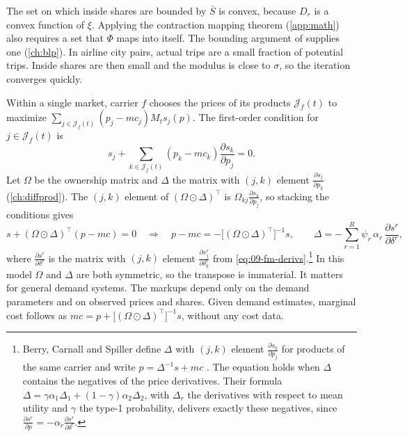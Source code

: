 The set on which inside shares are bounded by $\bar S$ is convex, because $D_r$ is a convex function of
$\xi$. Applying the contraction mapping theorem (\cref{app:math}) also requires a set that $\Phi$ maps
into itself. The bounding argument of \citet{BerryLevinsohnPakes1995} supplies one (\cref{ch:blp}).
In airline city pairs, actual trips are a small fraction of potential trips. Inside shares are then
small and the modulus is close to $\sigma$, so the iteration converges quickly.

Within a single market, carrier $f$ chooses the prices of its products $\mathcal{J}_f(t)$ to maximize
$\sum_{j\in\mathcal{J}_f(t)}(p_j-mc_j)M_ts_j(p)$. The first-order condition for $j\in\mathcal{J}_f(t)$ is
\begin{equation*}
s_j+\sum_{k\in\mathcal{J}_f(t)}(p_k-mc_k)\frac{\partial s_k}{\partial p_j}=0 .
\end{equation*}
Let $\Omega$ be the ownership matrix and $\Delta$ the matrix with $(j,k)$ element
$\frac{\partial s_j}{\partial p_k}$ (\cref{ch:diffprod}). The $(j,k)$ element of
$(\Omega\odot\Delta)^\top$ is $\Omega_{kj}\frac{\partial s_k}{\partial p_j}$, so stacking the conditions
gives
\begin{equation}\label{eq:09-fm-markup}
s+(\Omega\odot\Delta)^\top(p-mc)=0
\quad\Longrightarrow\quad
p-mc=-\big[(\Omega\odot\Delta)^\top\big]^{-1}s,
\qquad
\Delta=-\sum_{r=1}^R\psi_r\,\alpha_r\,\frac{\partial s^r}{\partial\delta^r},
\end{equation}
where $\frac{\partial s^r}{\partial\delta^r}$ is the matrix with $(j,k)$ element
$\frac{\partial s^r_j}{\partial\delta^r_k}$ from \eqref{eq:09-fm-derivs}.\footnote{Berry, Carnall and
Spiller define $\Delta$ with $(j,k)$ element $\frac{\partial s_k}{\partial p_j}$ for products of the same
carrier and write $p=\Delta^{-1}s+mc$ \citep[pp.~15--16]{BerryCarnallSpiller2006}. The equation holds when
$\Delta$ contains the negatives of the price derivatives. Their formula
$\Delta=\gamma\alpha_1\Delta_1+(1-\gamma)\alpha_2\Delta_2$, with $\Delta_r$ the derivatives with respect to
mean utility and $\gamma$ the type-1 probability, delivers exactly these negatives, since
$\frac{\partial s^r}{\partial p}=-\alpha_r\frac{\partial s^r}{\partial\delta^r}$.} In this model $\Omega$
and $\Delta$ are both symmetric, so the transpose is immaterial. It matters for general demand systems.
The markups depend only on the demand parameters and on observed prices and shares. Given demand
estimates, marginal cost follows as $mc=p+\big[(\Omega\odot\Delta)^\top\big]^{-1}s$, without any cost
data.

